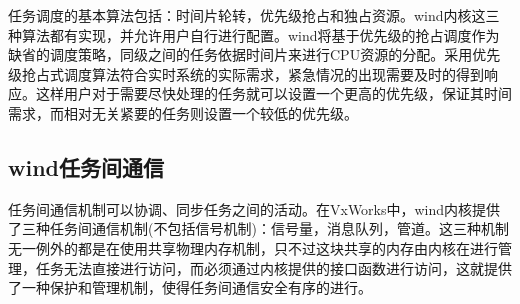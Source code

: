 	任务调度的基本算法包括：时间片轮转，优先级抢占和独占资源。wind内核这三种算法都有实现，并允许用户自行进行配置。wind将基于优先级的抢占调度作为缺省的调度策略，同级之间的任务依据时间片来进行CPU资源的分配。采用优先级抢占式调度算法符合实时系统的实际需求，紧急情况的出现需要及时的得到响应。这样用户对于需要尽快处理的任务就可以设置一个更高的优先级，保证其时间需求，而相对无关紧要的任务则设置一个较低的优先级。

\subsection{wind任务间通信}
	任务间通信机制可以协调、同步任务之间的活动。在VxWorks中，wind内核提供了三种任务间通信机制(不包括信号机制)：信号量，消息队列，管道。这三种机制无一例外的都是在使用共享物理内存机制，只不过这块共享的内存由内核在进行管理，任务无法直接进行访问，而必须通过内核提供的接口函数进行访问，这就提供了一种保护和管理机制，使得任务间通信安全有序的进行。

